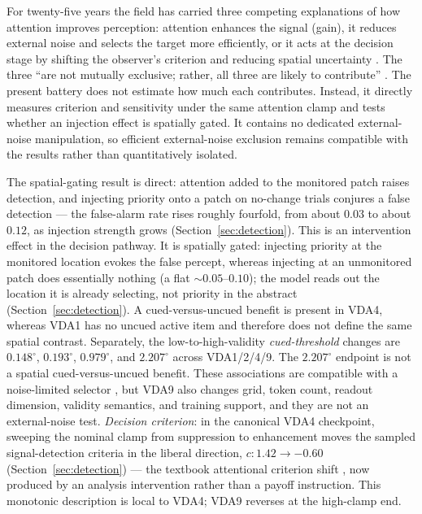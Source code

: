 For twenty-five years the field has carried three competing explanations
of how attention improves perception: attention enhances the signal
(gain), it reduces external noise and selects the target more
efficiently, or it acts at the decision stage by shifting the observer's
criterion and reducing spatial uncertainty
\cite{carrasco2011_visual_attention_25y}. The three ``are not mutually exclusive;
rather, all three are likely to contribute'' \cite{carrasco2011_visual_attention_25y}.
The present battery does not estimate how much each contributes. Instead, it directly
measures criterion and sensitivity under the same attention clamp and tests whether an
injection effect is spatially gated. It contains no dedicated external-noise manipulation,
so efficient external-noise exclusion remains compatible with the results rather than
quantitatively isolated.

The spatial-gating result is direct:
attention added to the monitored patch raises detection, and injecting
priority onto a patch on no-change trials conjures a false detection ---
the false-alarm rate rises roughly fourfold, from about $0.03$ to about
$0.12$, as injection strength grows (Section~\ref{sec:detection}). This
is an intervention effect in the decision pathway. It is spatially gated:
injecting priority at the monitored location evokes the false
percept, whereas injecting at an unmonitored patch does essentially
nothing (a flat $\sim$$0.05$--$0.10$); the model reads out the location
it is already selecting, not priority in the abstract
(Section~\ref{sec:detection}). A cued-versus-uncued benefit is present in
VDA4, whereas VDA1 has no uncued active item and therefore does not define
the same spatial contrast. Separately, the low-to-high-validity
\emph{cued-threshold} changes are $0.148^\circ$, $0.193^\circ$,
$0.979^\circ$, and $2.207^\circ$ across VDA1/2/4/9. The $2.207^\circ$
endpoint is not a spatial cued-versus-uncued benefit. These associations are compatible with a noise-limited selector
\cite{carrasco2011_visual_attention_25y, MullerFindlay1987}, but VDA9 also
changes grid, token count, readout dimension, validity semantics, and
training support, and they are not an external-noise test. \emph{Decision criterion}: in the canonical VDA4
checkpoint, sweeping the nominal clamp from suppression to enhancement
moves the sampled signal-detection criteria in the liberal direction,
$c: 1.42 \to -0.60$ (Section~\ref{sec:detection}) --- the textbook
attentional criterion shift \cite{MullerFindlay1987,posner1980_orienting},
now produced by an analysis intervention rather than a payoff instruction.
This monotonic description is local to VDA4; VDA9 reverses at the
high-clamp end.

